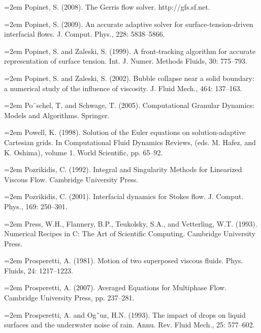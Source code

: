 \documentclass[11pt,a4paper,openany,fontset=none]{ctexbook}
\begin{document}
\par\hangindent=2em Popinet, S. (2008). The Gerris flow solver. http://gfs.sf.net.

\par\hangindent=2em Popinet, S. (2009). An accurate adaptive solver for surface-tension-driven interfacial flows. J. Comput. Phys., 228: 5838--5866.

\par\hangindent=2em Popinet, S. and Zaleski, S. (1999). A front-tracking algorithm for accurate representation of surface tension. Int. J. Numer. Methods Fluids, 30: 775--793.

\par\hangindent=2em Popinet, S. and Zaleski, S. (2002). Bubble collapse near a solid boundary: a numerical study of the influence of viscosity. J. Fluid Mech., 464: 137--163.

\par\hangindent=2em Po¨schel, T. and Schwage, T. (2005). Computational Granular Dynamics: Models and Algorithms. Springer.

\par\hangindent=2em Powell, K. (1998). Solution of the Euler equations on solution-adaptive Cartesian grids. In Computational Fluid Dynamics Reviews, (eds. M. Hafez, and K. Oshima), volume 1. World Scientific, pp. 65--92.

\par\hangindent=2em Pozrikidis, C. (1992). Integral and Singularity Methods for Linearized Viscous Flow. Cambridge University Press.

\par\hangindent=2em Pozrikidis, C. (2001). Interfacial dynamics for Stokes flow. J. Comput. Phys., 169: 250--301.

\par\hangindent=2em Press, W.H., Flannery, B.P., Teukolsky, S.A., and Vetterling, W.T. (1993). Numerical Recipes in C: The Art of Scientific Computing. Cambridge University Press.

\par\hangindent=2em Prosperetti, A. (1981). Motion of two superposed viscous fluids. Phys. Fluids, 24: 1217--1223.


\par\hangindent=2em Prosperetti, A. (2007). Averaged Equations for Multiphase Flow. Cambridge University Press, pp. 237--281.

\par\hangindent=2em Prosperetti, A. and Og˜uz, H.N. (1993). The impact of drops on liquid surfaces and the underwater noise of rain. Annu. Rev. Fluid Mech., 25: 577--602.
\end{document}
